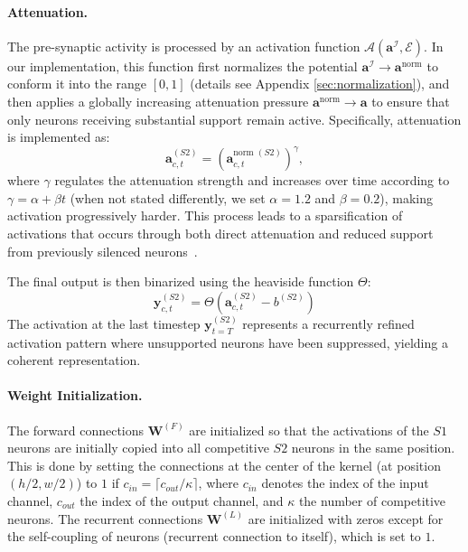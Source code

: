 \documentclass[12pt]{article}
\begin{document}
\paragraph{Attenuation.}
The pre-synaptic activity is processed by an activation function $\mathcal{A} \left(\boldsymbol{a}^\mathcal{I}, \mathcal{E} \right)$. In our implementation, this function first normalizes the potential  $\boldsymbol{a}^\mathcal{I} \rightarrow \boldsymbol{a}^{\text{norm}}$ to conform it into the range $[0, 1]$ (details see Appendix \ref{sec:normalization}), and then applies a globally increasing attenuation pressure $\boldsymbol{a}^{\text{norm}} \rightarrow \boldsymbol{a}$ to ensure that only neurons receiving substantial support remain active.
Specifically, attenuation is implemented as:
%
\begin{equation} 
    \boldsymbol{a}^{(S2)}_{c,t} = \left(\boldsymbol{a}^{\text{norm }(S2)}_{c,t}\right)^\gamma,
    \label{eq:inhibition}
\end{equation}
%
where $\gamma$ regulates the attenuation strength and increases over time according to $\gamma=\alpha+\beta t$ (when not stated differently, we set $\alpha=1.2$ and $\beta=0.2$), making activation progressively harder. This process leads to a sparsification of activations that occurs through both direct attenuation and reduced support from previously silenced neurons~.

The final output is then binarized using the heaviside function $\Theta$:
%
\begin{equation} 
     \boldsymbol{y}_{c,t}^{(S2)} = \Theta\left(\boldsymbol{a}^{(S2)}_{c,t}  - b^{(S2)} \right)
     \label{eq:s2_final_output}
\end{equation}
%
The activation at the last timestep $\boldsymbol{y}^{(S2)}_{t=T}$ represents a recurrently refined activation pattern where unsupported neurons have been suppressed, yielding a coherent representation.

\paragraph{Weight Initialization.}
The forward connections $\boldsymbol{W}^{(F)}$ are initialized so that the activations of the $S1$ neurons are initially copied into all competitive $S2$ neurons in the same position. This is done by setting the connections at the center of the kernel (at position $(h/2, w/2)$) to $1$ if $c_{in} = \lceil c_{out} / \kappa \rceil$, where $c_{in}$ denotes the index of the input channel, $c_{out}$ the index of the output channel, and $\kappa$ the number of competitive neurons. The recurrent connections $\boldsymbol{W}^{(L)}$ are initialized with zeros except for the self-coupling of neurons (recurrent connection to itself), which is set to $1$.
\end{document}
